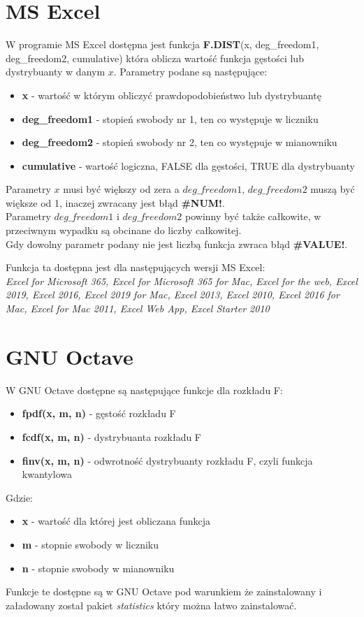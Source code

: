 \documentclass{article}
\begin{document}
\section{MS Excel}
W programie MS Excel dostępna jest funkcja \textbf{F.DIST}(x, deg\_freedom1, deg\_freedom2, cumulative) która oblicza wartość funkcja gęstości lub dystrybuanty w danym $x$. Parametry podane są następujące:
\begin{itemize}
\item \textbf{x} - wartość w którym obliczyć prawdopodobieństwo lub dystrybuantę
\item \textbf{deg\_freedom1} - stopień swobody nr 1, ten co występuje w liczniku
\item \textbf{deg\_freedom2} - stopień swobody nr 2, ten co występuje w mianowniku
\item \textbf{cumulative} - wartość logiczna, FALSE dla gęstości, TRUE dla dystrybuanty
\end{itemize}
Parametry $x$ musi być większy od zera a $deg\_freedom1$, $deg\_freedom2$ muszą być większe od 1, inaczej zwracany jest błąd \textbf{\#NUM!}. \\
Parametry $deg\_freedom1$ i $deg\_freedom2$ powinny być także całkowite, w przeciwnym wypadku są obcinane do liczby całkowitej. \\
Gdy dowolny parametr podany nie jest liczbą funkcja zwraca błąd \textbf{\#VALUE!}. \\ \par
Funkcja ta dostępna jest dla następujących wersji MS Excel: \\
\textit{Excel for Microsoft 365, Excel for Microsoft 365 for Mac, Excel for the web, Excel 2019, Excel 2016, Excel 2019 for Mac, Excel 2013, Excel 2010, Excel 2016 for Mac, Excel for Mac 2011, Excel Web App, Excel Starter 2010}

\newpage
\section{GNU Octave}
W GNU Octave dostępne są następujące funkcje dla rozkładu F:
\begin{itemize}
\item \textbf{fpdf(x, m, n)} - gęstość rozkładu F
\item \textbf{fcdf(x, m, n)} - dystrybuanta rozkładu F
\item \textbf{finv(x, m, n)} - odwrotność dystrybuanty rozkładu F, czyli funkcja kwantylowa
\end{itemize}
Gdzie: 
\begin{itemize}
\item \textbf{x} - wartość dla której jest obliczana funkcja
\item \textbf{m} - stopnie swobody w liczniku
\item \textbf{n} - stopnie swobody w mianowniku
\end{itemize}
Funkcje te dostępne są w GNU Octave pod warunkiem że zainstalowany i załadowany został pakiet \textit{statistics} który można łatwo zainstalować.
\end{document}
